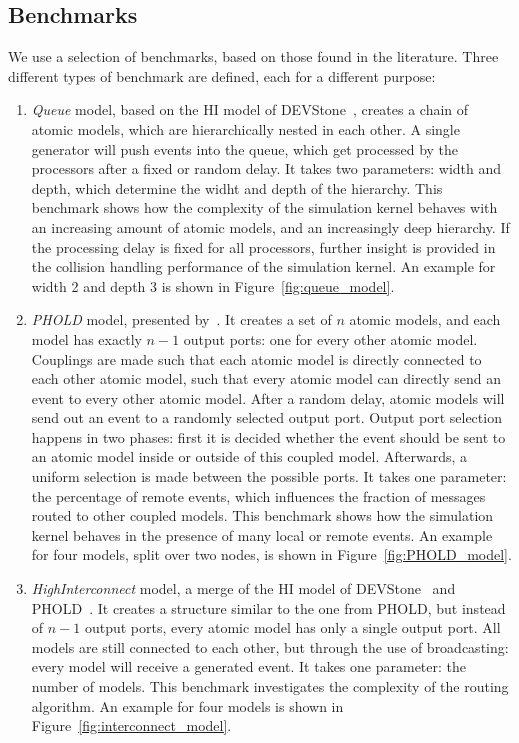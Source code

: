 \subsection{Benchmarks}
We use a selection of benchmarks, based on those found in the literature.
Three different types of benchmark are defined, each for a different purpose:
\begin{enumerate}
    \item \textit{Queue} model, based on the HI model of DEVStone~\cite{DEVStone}, creates a chain of atomic models, which are hierarchically nested in each other.
          A single generator will push events into the queue, which get processed by the processors after a fixed or random delay.
          It takes two parameters: width and depth, which determine the widht and depth of the hierarchy.
          This benchmark shows how the complexity of the simulation kernel behaves with an increasing amount of atomic models, and an increasingly deep hierarchy.
          If the processing delay is fixed for all processors, further insight is provided in the collision handling performance of the simulation kernel.
          An example for width 2 and depth 3 is shown in Figure~\ref{fig:queue_model}.

    \item \textit{PHOLD} model, presented by~\cite{PHOLD}.
          It creates a set of $n$ atomic models, and each model has exactly $n-1$ output ports: one for every other atomic model.
          Couplings are made such that each atomic model is directly connected to each other atomic model, such that every atomic model can directly send an event to every other atomic model.
          After a random delay, atomic models will send out an event to a randomly selected output port.
          Output port selection happens in two phases: first it is decided whether the event should be sent to an atomic model inside or outside of this coupled model.
          Afterwards, a uniform selection is made between the possible ports.
          It takes one parameter: the percentage of remote events, which influences the fraction of messages routed to other coupled models.
          This benchmark shows how the simulation kernel behaves in the presence of many local or remote events.
          An example for four models, split over two nodes, is shown in Figure~\ref{fig:PHOLD_model}.

    \item \textit{HighInterconnect} model, a merge of the HI model of DEVStone~\cite{DEVStone} and PHOLD~\cite{PHOLD}.
          It creates a structure similar to the one from PHOLD, but instead of $n-1$ output ports, every atomic model has only a single output port.
          All models are still connected to each other, but through the use of broadcasting: every model will receive a generated event.
          It takes one parameter: the number of models.
          This benchmark investigates the complexity of the routing algorithm.
          An example for four models is shown in Figure~\ref{fig:interconnect_model}.
\end{enumerate}

